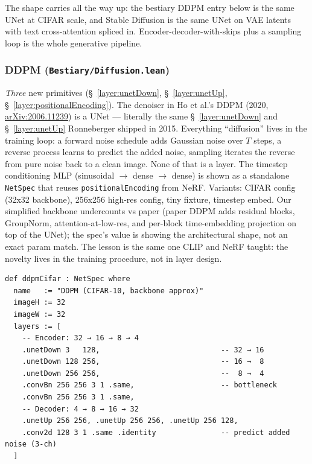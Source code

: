 The shape carries all the way up: the bestiary DDPM entry below is the same UNet
at CIFAR scale, and Stable Diffusion is the same UNet on VAE latents with text
cross-attention spliced in. Encoder-decoder-with-skips plus a sampling loop is
the whole generative pipeline.

\subsubsection*{DDPM (\texttt{Bestiary/Diffusion.lean})}
\emph{Three} new primitives (\S~\ref{layer:unetDown}, \S~\ref{layer:unetUp}, \S~\ref{layer:positionalEncoding}). The denoiser in Ho et al.'s DDPM (2020,
\href{https://arxiv.org/abs/2006.11239}{arXiv:2006.11239}) is a UNet
--- literally the same \S~\ref{layer:unetDown} and
\S~\ref{layer:unetUp} Ronneberger shipped in 2015. Everything ``diffusion'' lives in the training loop:
a forward noise schedule adds Gaussian noise over $T$ steps, a reverse
process learns to predict the added noise, sampling iterates the
reverse from pure noise back to a clean image. None of that is a
layer. The timestep conditioning MLP (sinusoidal $\to$ dense $\to$
dense) is shown as a standalone \texttt{NetSpec} that reuses
\texttt{positionalEncoding} from NeRF. Variants: CIFAR config (32x32
backbone), 256x256 high-res config, tiny fixture, timestep embed.
Our simplified backbone undercounts vs paper (paper DDPM adds
residual blocks, GroupNorm, attention-at-low-res, and per-block
time-embedding projection on top of the UNet); the spec's value is
showing the architectural shape, not an exact param match. The
lesson is the same one CLIP and NeRF taught: the novelty lives in
the training procedure, not in layer design.

\begin{verbatim}
def ddpmCifar : NetSpec where
  name   := "DDPM (CIFAR-10, backbone approx)"
  imageH := 32
  imageW := 32
  layers := [
    -- Encoder: 32 → 16 → 8 → 4
    .unetDown 3   128,                            -- 32 → 16
    .unetDown 128 256,                            -- 16 →  8
    .unetDown 256 256,                            --  8 →  4
    .convBn 256 256 3 1 .same,                    -- bottleneck
    .convBn 256 256 3 1 .same,
    -- Decoder: 4 → 8 → 16 → 32
    .unetUp 256 256, .unetUp 256 256, .unetUp 256 128,
    .conv2d 128 3 1 .same .identity               -- predict added noise (3-ch)
  ]
\end{verbatim}

